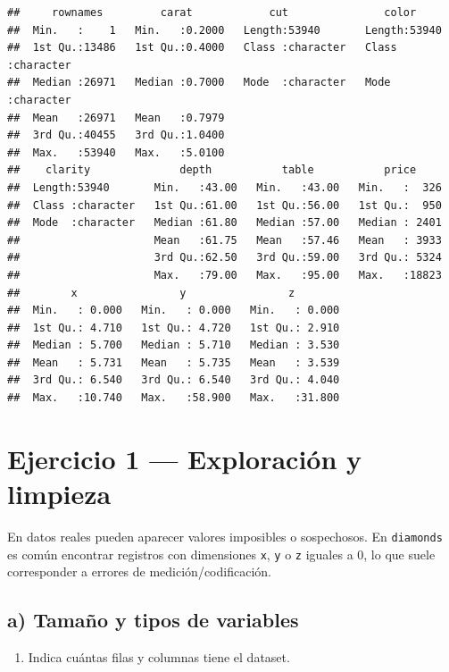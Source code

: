 \documentclass[
  spanish,
]{article}
\providecommand{\tightlist}{%
  \setlength{\itemsep}{0pt}\setlength{\parskip}{0pt}}
\begin{document}
\begin{verbatim}
##     rownames         carat            cut               color          
##  Min.   :    1   Min.   :0.2000   Length:53940       Length:53940      
##  1st Qu.:13486   1st Qu.:0.4000   Class :character   Class :character  
##  Median :26971   Median :0.7000   Mode  :character   Mode  :character  
##  Mean   :26971   Mean   :0.7979                                        
##  3rd Qu.:40455   3rd Qu.:1.0400                                        
##  Max.   :53940   Max.   :5.0100                                        
##    clarity              depth           table           price      
##  Length:53940       Min.   :43.00   Min.   :43.00   Min.   :  326  
##  Class :character   1st Qu.:61.00   1st Qu.:56.00   1st Qu.:  950  
##  Mode  :character   Median :61.80   Median :57.00   Median : 2401  
##                     Mean   :61.75   Mean   :57.46   Mean   : 3933  
##                     3rd Qu.:62.50   3rd Qu.:59.00   3rd Qu.: 5324  
##                     Max.   :79.00   Max.   :95.00   Max.   :18823  
##        x                y                z         
##  Min.   : 0.000   Min.   : 0.000   Min.   : 0.000  
##  1st Qu.: 4.710   1st Qu.: 4.720   1st Qu.: 2.910  
##  Median : 5.700   Median : 5.710   Median : 3.530  
##  Mean   : 5.731   Mean   : 5.735   Mean   : 3.539  
##  3rd Qu.: 6.540   3rd Qu.: 6.540   3rd Qu.: 4.040  
##  Max.   :10.740   Max.   :58.900   Max.   :31.800
\end{verbatim}

\section*{Ejercicio 1 --- Exploración y
limpieza}\label{ejercicio-1-exploraciuxf3n-y-limpieza}

En datos reales pueden aparecer valores imposibles o sospechosos. En
\texttt{diamonds} es común encontrar registros con dimensiones
\texttt{x}, \texttt{y} o \texttt{z} iguales a 0, lo que suele
corresponder a errores de medición/codificación.

\subsection*{a) Tamaño y tipos de
variables}\label{a-tamauxf1o-y-tipos-de-variables}

\begin{enumerate}
\def\labelenumi{\arabic{enumi}.}
\tightlist
\item
  Indica cuántas filas y columnas tiene el dataset.
\end{enumerate}
\end{document}
